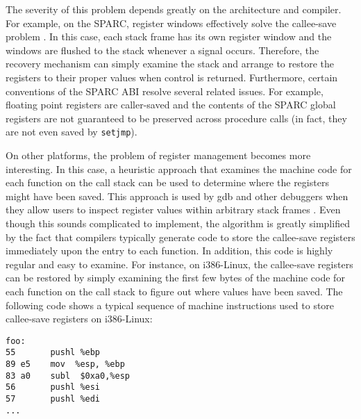 The severity of this problem depends greatly on the architecture and
compiler.  For example, on the SPARC, register windows effectively
solve the callee-save problem \cite{sparc}.  In this case, each stack
frame has its own register window and the windows are flushed to the
stack whenever a signal occurs.  Therefore, the recovery mechanism can
simply examine the stack and arrange to restore the registers to their
proper values when control is returned.  Furthermore, certain
conventions of the SPARC ABI resolve several related issues. For
example, floating point registers are caller-saved and the contents of
the SPARC global registers are not guaranteed to be preserved across
procedure calls (in fact, they are not even saved by {\tt setjmp}).

On other platforms, the problem of register management becomes 
more interesting.  In this case, a heuristic approach that examines
the machine code for each function on the call stack can be used to
determine where the registers might have been saved.  This approach is
used by gdb and other debuggers when they allow users to inspect
register values within arbitrary stack frames \cite{gdb}.  Even though
this sounds complicated to implement, the algorithm is greatly
simplified by the fact that compilers typically generate code to store
the callee-save registers immediately upon the entry to each function.
In addition, this code is highly regular and easy to examine.  For
instance, on i386-Linux, the callee-save registers can be restored by
simply examining the first few bytes of the machine code for each
function on the call stack to figure out where values have been saved.
The following code shows a typical sequence of machine instructions
used to store callee-save registers on i386-Linux:

\begin{verbatim}
foo:
55       pushl %ebp
89 e5    mov  %esp, %ebp
83 a0    subl  $0xa0,%esp 
56       pushl %esi   
57       pushl %edi
...
\end{verbatim}

%
%

